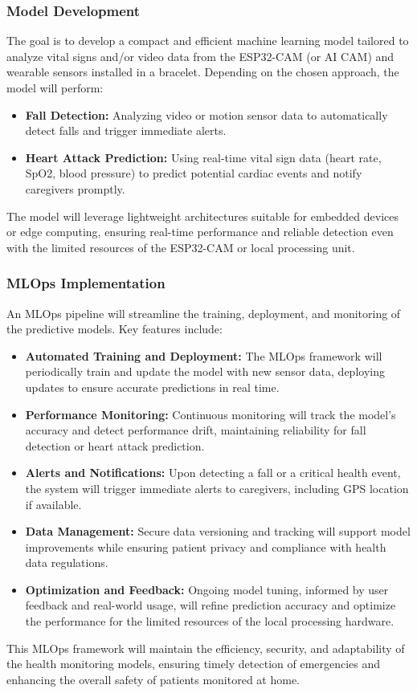 \subsubsection{Model Development}
The goal is to develop a compact and efficient machine learning model tailored to analyze vital signs 
and/or video data from the ESP32-CAM (or AI CAM) and wearable sensors installed in a bracelet. 
Depending on the chosen approach, the model will perform:

\begin{itemize}
    \item \textbf{Fall Detection:} Analyzing video or motion sensor data to automatically detect falls 
    and trigger immediate alerts.
    \item \textbf{Heart Attack Prediction:} Using real-time vital sign data (heart rate, SpO2, blood pressure) 
    to predict potential cardiac events and notify caregivers promptly.
\end{itemize}

The model will leverage lightweight architectures suitable for embedded devices 
or edge computing, ensuring real-time performance and reliable detection 
even with the limited resources of the ESP32-CAM or local processing unit.

\subsubsection{MLOps Implementation}
An MLOps pipeline will streamline the training, deployment, and monitoring of the predictive models. 
Key features include:

\begin{itemize}
    \item \textbf{Automated Training and Deployment:} The MLOps framework will periodically train and update 
    the model with new sensor data, deploying updates to ensure accurate predictions in real time.
    \item \textbf{Performance Monitoring:} Continuous monitoring will track the model’s accuracy 
    and detect performance drift, maintaining reliability for fall detection or heart attack prediction.
    \item \textbf{Alerts and Notifications:} Upon detecting a fall or a critical health event, 
    the system will trigger immediate alerts to caregivers, including GPS location if available.
    \item \textbf{Data Management:} Secure data versioning and tracking will support model improvements 
    while ensuring patient privacy and compliance with health data regulations.
    \item \textbf{Optimization and Feedback:} Ongoing model tuning, informed by user feedback 
    and real-world usage, will refine prediction accuracy and optimize the performance 
    for the limited resources of the local processing hardware.
\end{itemize}

This MLOps framework will maintain the efficiency, security, and adaptability of the health monitoring models, 
ensuring timely detection of emergencies and enhancing the overall safety of patients monitored at home.
